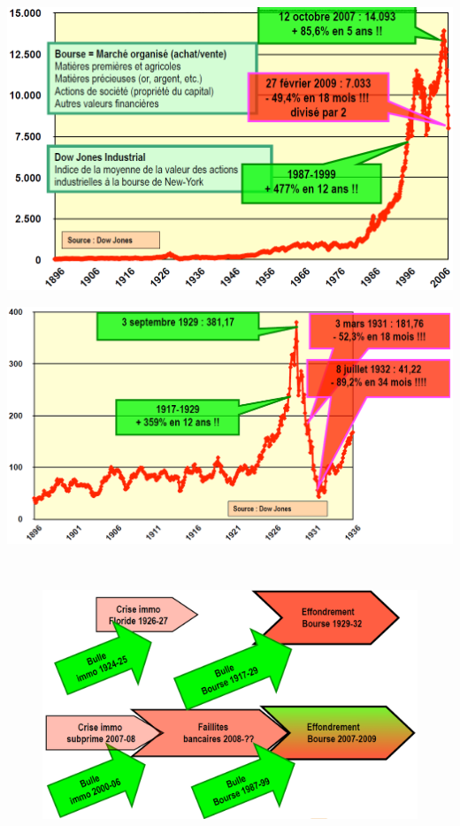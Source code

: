 \begin{minipage}{0.5\textwidth}
	\begin{flushleft}
		\includegraphics[scale=0.26]{44}
	\end{flushleft}
\end{minipage}
\begin{minipage}{0.5\textwidth}
	\begin{center}
		\includegraphics[scale=0.29]{45}
	\end{center}
\end{minipage}
\\
\begin{figure}
\includegraphics[scale=0.3]{46}
\end{figure}
